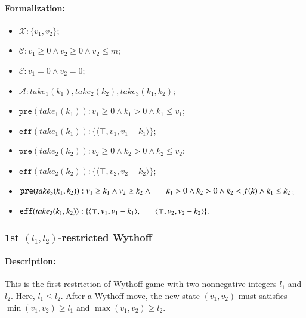 \documentclass[review]{elsarticle}
\newcommand{\set}[1]{\{ #1 \}}
\newcommand{\tuple}[1]{\langle {#1} \rangle}
\newcommand{\true}{\top}
\newcommand{\statevar}{\mathcal{X}}
\newcommand{\act}{\mathcal{A}}
\newcommand{\constraint}{\mathcal{C}}
\newcommand{\estate}{\mathcal{E}}
\newcommand{\pre}{\mathtt{pre}}
\newcommand{\eff}{\mathtt{eff}}
\begin{document}
\paragraph{Formalization:}
\begin{itemize}
	\item $\statevar: \set{v_1, v_2}$;
	\item $\constraint: v_1 \ge 0 \wedge v_2 \ge 0 \wedge v_2 \le m$;
	\item $\estate: v_1=0 \wedge v_2 = 0$;
	\item $\act:take_1(k_1), take_2(k_2), take_3(k_1,k_2)$;
	\item $\pre(take_1(k_1)) : v_1 \ge 0 \wedge k_1 > 0 \wedge k_1 \le v_1$;
	\item $\eff(take_1(k_1)) : \set{\tuple{\true, v_1, v_1-k_1}}$;
	\item $\pre(take_2(k_2)) : v_2 \ge 0 \wedge k_2 > 0 \wedge k_2 \le v_2$;
	\item $\eff(take_2(k_2)) : \set{\tuple{\true, v_2, v_2-k_2}}$;
	\item $\pre(take_3(k_1, k_2)) : v_1 \ge k_1 \wedge v_2 \ge k_2 \wedge \\ \hspace*{6mm}
	k_1 > 0 \wedge k_2 > 0\wedge k_2 < f(k) \wedge k_1 \le k_2$;
	\item $\eff(take_3(k_1, k_2)) : \set{\tuple{\true, v_1, v_1 -k_1},\\ \hspace*{6mm}
		\tuple{\true, v_2, v_2 - k_2}}$.
\end{itemize}



\subsubsection{1st $(l_1, l_2)$-restricted Wythoff \protect\cite{FraH2014}}

\paragraph{Description:} 
This is the first restriction of Wythoff game with two nonnegative integers $l_1$ and $l_2$.
Here, $l_1 \le l_2$.
After a Wythoff move, the new state $(v_1, v_2)$ must satisfies $\min(v_1, v_2) \ge l_1$ and $\max(v_1, v_2) \ge l_2$.

\end{document}
